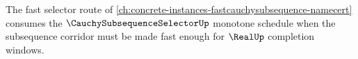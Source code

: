 The fast selector route of \autoref{ch:concrete-instances-fastcauchysubsequence-namecert} consumes the $\CauchySubsequenceSelectorUp$ monotone schedule when the subsequence corridor must be made fast enough for $\RealUp$ completion windows.
